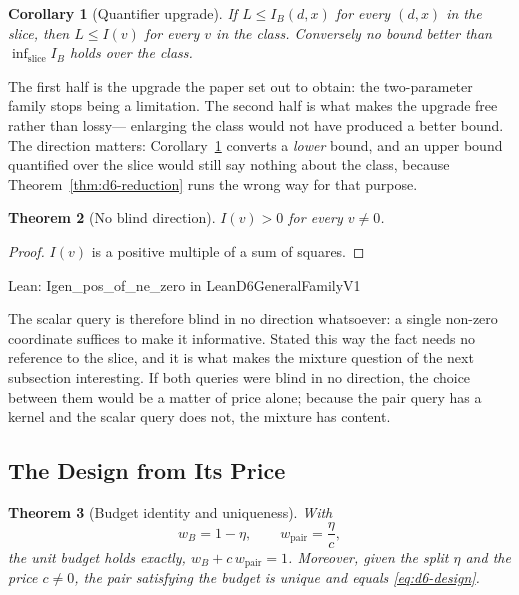 \documentclass[conference]{IEEEtran}
\newtheorem{theorem}{Theorem}
\newtheorem{corollary}[theorem]{Corollary}
\theoremstyle{definition}
\newcommand{\lean}[1]{\textsf{\footnotesize #1}}
\newcommand{\leanbox}[1]{%
  \par\vspace{2pt}\noindent
  {\footnotesize\textsf{Lean: #1}}\par\vspace{2pt}}
\begin{document}
\begin{corollary}[Quantifier upgrade]
\label{cor:d6-upgrade}
If $L\le I_{B}(d,x)$ for every $(d,x)$ in the slice, then $L\le I(v)$ for every $v$ in the
class. Conversely no bound better than $\inf_{\text{slice}}I_{B}$ holds over the class.
\end{corollary}

The first half is the upgrade the paper set out to obtain: the two-parameter family stops
being a limitation. The second half is what makes the upgrade free rather than lossy---
enlarging the class would not have produced a better bound. The direction matters:
Corollary~\ref{cor:d6-upgrade} converts a \emph{lower} bound, and an upper bound quantified over
the slice would still say nothing about the class, because Theorem~\ref{thm:d6-reduction} runs
the wrong way for that purpose.

\begin{theorem}[No blind direction]
\label{thm:d6-nonblind}
$I(v)>0$ for every $v\neq0$.
\end{theorem}

\begin{proof}
$I(v)$ is a positive multiple of a sum of squares.
\end{proof}

\leanbox{\lean{Igen\_pos\_of\_ne\_zero} in \lean{LeanD6GeneralFamilyV1}}

The scalar query is therefore blind in no direction whatsoever: a single non-zero coordinate
suffices to make it informative. Stated this way the fact needs no reference to the slice, and
it is what makes the mixture question of the next subsection interesting. If both queries were
blind in no direction, the choice between them would be a matter of price alone; because the
pair query has a kernel and the scalar query does not, the mixture has content.

\subsection{The Design from Its Price}
\label{sec:d6-design}

\begin{theorem}[Budget identity and uniqueness]
\label{thm:d6-unique}
With
\begin{equation}
w_{B}=1-\eta,\qquad
w_{\mathrm{pair}}=\frac{\eta}{c},
\label{eq:d6-design}
\end{equation}
the unit budget holds exactly, $w_{B}+c\,w_{\mathrm{pair}}=1$. Moreover, given the split
$\eta$ and the price $c\neq0$, the pair satisfying the budget is unique and equals
\eqref{eq:d6-design}.
\end{theorem}
\end{document}
